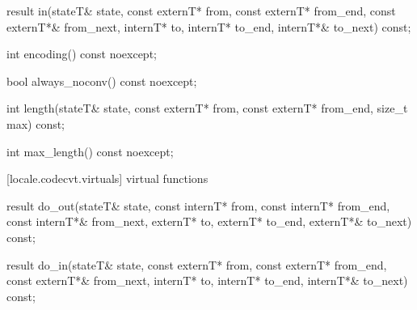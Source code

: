 %
\begin{itemdecl}
result in(stateT& state,
  const externT* from, const externT* from_end, const externT*& from_next,
        internT* to, internT* to_end, internT*& to_next) const;
\end{itemdecl}

\begin{itemdescr}
\pnum
\returns
{}
\end{itemdescr}

%
\begin{itemdecl}
int encoding() const noexcept;
\end{itemdecl}

\begin{itemdescr}
\pnum
\returns
{}
\end{itemdescr}

%
\begin{itemdecl}
bool always_noconv() const noexcept;
\end{itemdecl}

\begin{itemdescr}
\pnum
\returns
{}
\end{itemdescr}

%
\begin{itemdecl}
int length(stateT& state, const externT* from, const externT* from_end,
           size_t max) const;
\end{itemdecl}

\begin{itemdescr}
\pnum
\returns
{}
\end{itemdescr}

%
\begin{itemdecl}
int max_length() const noexcept;
\end{itemdecl}

\begin{itemdescr}
\pnum
\returns
{}
\end{itemdescr}

[locale.codecvt.virtuals]{ virtual functions}

%
%
\begin{itemdecl}
result do_out(stateT& state,
  const internT* from, const internT* from_end, const internT*& from_next,
  externT* to, externT* to_end, externT*& to_next) const;

result do_in(stateT& state,
  const externT* from, const externT* from_end, const externT*& from_next,
        internT* to, internT* to_end, internT*& to_next) const;
\end{itemdecl}

